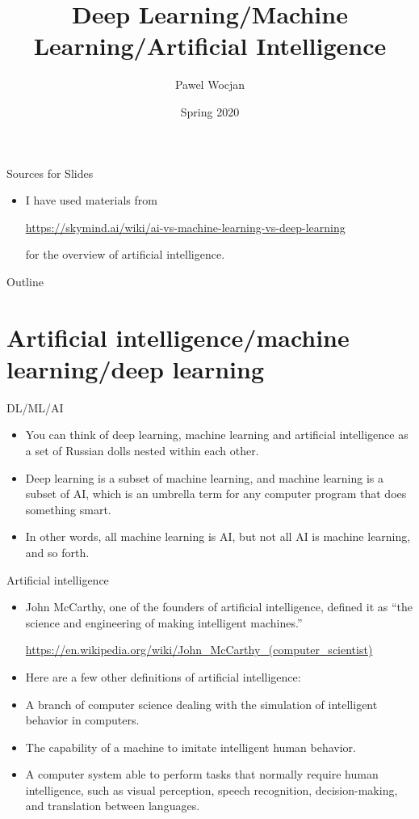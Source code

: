 \documentclass{beamer}
\title[AI]{Deep Learning/Machine Learning/Artificial Intelligence}
\author{Pawel Wocjan}
\institute{University of Central Florida}
\date{Spring 2020}
\begin{document}
\begin{frame}
  \titlepage
\end{frame}

\begin{frame}{Sources for Slides}

\begin{itemize}
\item  I have used materials from 

\url{https://skymind.ai/wiki/ai-vs-machine-learning-vs-deep-learning} 

for the overview of artificial intelligence.
\end{itemize}
\end{frame}

\begin{frame}{Outline}
  \tableofcontents
\end{frame}

\section{Artificial intelligence/machine learning/deep learning}

\begin{frame}{DL/ML/AI}
\begin{itemize}
\item You can think of deep learning, machine learning and artificial intelligence as a set of Russian dolls nested within each other. 
\item Deep learning is a subset of machine learning, and machine learning is a subset of AI, which is an umbrella term for any computer program that does something smart. \item In other words, all machine learning is AI, but not all AI is machine learning, and so forth.
\end{itemize}
\end{frame}

\begin{frame}{Artificial intelligence}
\begin{itemize}
\item John McCarthy, one of the founders of artificial intelligence, defined it as ``the science and engineering of making intelligent machines.''

\url{https://en.wikipedia.org/wiki/John_McCarthy_(computer_scientist)}

\item Here are a few other definitions of artificial intelligence:

\item A branch of computer science dealing with the simulation of intelligent behavior in computers.

\item The capability of a machine to imitate intelligent human behavior.

\item A computer system able to perform tasks that normally require human intelligence, such as visual perception, speech recognition, decision-making, and translation between languages.
\end{itemize}
\end{frame}
\end{document}
